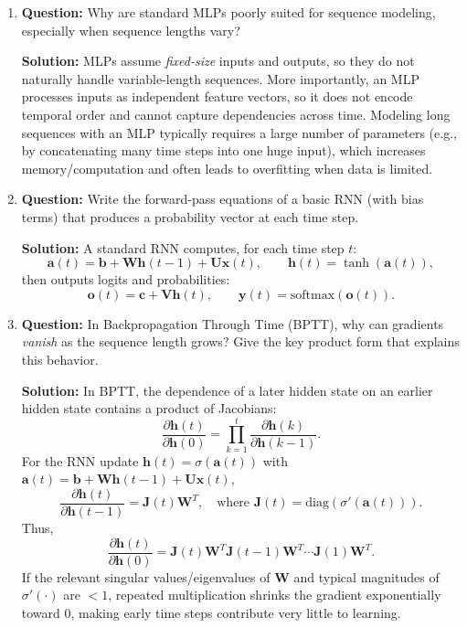 \documentclass{article}
\begin{document}
\begin{enumerate}
    \item \textbf{Question:} 
    Why are standard MLPs poorly suited for sequence modeling, especially when sequence lengths vary?

    \textbf{Solution:}
    MLPs assume \emph{fixed-size} inputs and outputs, so they do not naturally handle variable-length sequences. More importantly, an MLP processes inputs as independent feature vectors, so it does not encode temporal order and cannot capture dependencies across time. Modeling long sequences with an MLP typically requires a large number of parameters (e.g., by concatenating many time steps into one huge input), which increases memory/computation and often leads to overfitting when data is limited.

    \item \textbf{Question:}
    Write the forward-pass equations of a basic RNN (with bias terms) that produces a probability vector at each time step.

    \textbf{Solution:}
    A standard RNN computes, for each time step $t$:
    \[
    \mathbf{a}(t)=\mathbf{b}+\mathbf{W}\mathbf{h}(t-1)+\mathbf{U}\mathbf{x}(t),
    \qquad
    \mathbf{h}(t)=\tanh(\mathbf{a}(t)),
    \]
    then outputs logits and probabilities:
    \[
    \mathbf{o}(t)=\mathbf{c}+\mathbf{V}\mathbf{h}(t),
    \qquad
    \mathbf{y}(t)=\mathrm{softmax}(\mathbf{o}(t)).
    \]

    \item \textbf{Question:}
    In Backpropagation Through Time (BPTT), why can gradients \emph{vanish} as the sequence length grows? Give the key product form that explains this behavior.

    \textbf{Solution:}
    In BPTT, the dependence of a later hidden state on an earlier hidden state contains a product of Jacobians:
    \[
    \frac{\partial \mathbf{h}(t)}{\partial \mathbf{h}(0)}
    =\prod_{k=1}^{t}\frac{\partial \mathbf{h}(k)}{\partial \mathbf{h}(k-1)}.
    \]
    For the RNN update $\mathbf{h}(t)=\sigma(\mathbf{a}(t))$ with $\mathbf{a}(t)=\mathbf{b}+\mathbf{W}\mathbf{h}(t-1)+\mathbf{U}\mathbf{x}(t)$,
    \[
    \frac{\partial \mathbf{h}(t)}{\partial \mathbf{h}(t-1)}=\mathbf{J}(t)\mathbf{W}^T,
    \quad \text{where } \mathbf{J}(t)=\mathrm{diag}(\sigma'(\mathbf{a}(t))).
    \]
    Thus,
    \[
    \frac{\partial \mathbf{h}(t)}{\partial \mathbf{h}(0)}
    =\mathbf{J}(t)\mathbf{W}^T\mathbf{J}(t-1)\mathbf{W}^T\cdots \mathbf{J}(1)\mathbf{W}^T.
    \]
    If the relevant singular values/eigenvalues of $\mathbf{W}$ and typical magnitudes of $\sigma'(\cdot)$ are $<1$, repeated multiplication shrinks the gradient exponentially toward $0$, making early time steps contribute very little to learning.


\end{enumerate}
\end{document}
